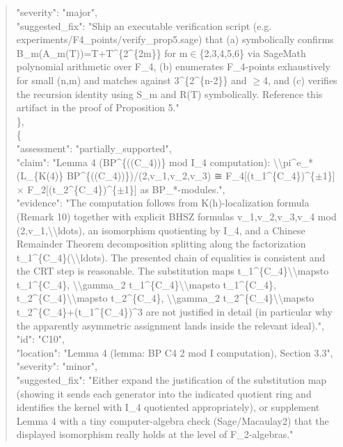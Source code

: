 \documentclass[11pt]{article}
\begin{document}
\begin{quote}
      "severity": "major",\\
      "suggested\_fix": "Ship an executable verification script (e.g. experiments/F4\_points/verify\_prop5.sage) that (a) symbolically confirms B\_m(A\_m(T))=T+T\^{}\{2\^{}\{2m\}\} for m\ensuremath{\in}\{2,3,4,5,6\} via SageMath polynomial arithmetic over F\_4, (b) enumerates F\_4-points exhaustively for small (n,m) and matches against 3\^{}\{2\^{}\{n-2\}\} and \ensuremath{\ge}4, and (c) verifies the recursion identity using S\_m and R(T) symbolically. Reference this artifact in the proof of Proposition 5."\\
    \},\\
    \{\\
      "assessment": "partially\_supported",\\
      "claim": "Lemma 4 (BP\^{}\{((C\_4))\}<2> mod I\_4 computation): \textbackslash{}\textbackslash{}pi\^{}e\_*(L\_\{K(4)\} BP\^{}\{((C\_4))\}<2>)/(2,v\_1,v\_2,v\_3) ≅ F\_4[(t\_1\^{}\{C\_4\})\^{}\{\ensuremath{\pm}1\}] \ensuremath{\times} F\_2[(t\_2\^{}\{C\_4\})\^{}\{\ensuremath{\pm}1\}] as BP\_*-modules.",\\
      "evidence": "The computation follows from K(h)-localization formula (Remark 10) together with explicit BHSZ formulas v\_1,v\_2,v\_3,v\_4 mod (2,v\_1,\textbackslash{}\textbackslash{}ldots), an isomorphism quotienting by I\_4, and a Chinese Remainder Theorem decomposition splitting along the factorization t\_1\^{}\{C\_4\}(\textbackslash{}\textbackslash{}ldots). The presented chain of equalities is consistent and the CRT step is reasonable. The substitution maps t\_1\^{}\{C\_4\}\textbackslash{}\textbackslash{}mapsto t\_1\^{}\{C\_4\}, \textbackslash{}\textbackslash{}gamma\_2 t\_1\^{}\{C\_4\}\textbackslash{}\textbackslash{}mapsto t\_1\^{}\{C\_4\}, t\_2\^{}\{C\_4\}\textbackslash{}\textbackslash{}mapsto t\_2\^{}\{C\_4\}, \textbackslash{}\textbackslash{}gamma\_2 t\_2\^{}\{C\_4\}\textbackslash{}\textbackslash{}mapsto t\_2\^{}\{C\_4\}+(t\_1\^{}\{C\_4\})\^{}3 are not justified in detail (in particular why the apparently asymmetric assignment lands inside the relevant ideal).",\\
      "id": "C10",\\
      "location": "Lemma 4 (lemma: BP C4 2 mod I computation), Section 3.3",\\
      "severity": "minor",\\
      "suggested\_fix": "Either expand the justification of the substitution map (showing it sends each generator into the indicated quotient ring and identifies the kernel with I\_4 quotiented appropriately), or supplement Lemma 4 with a tiny computer-algebra check (Sage/Macaulay2) that the displayed isomorphism really holds at the level of F\_2-algebras."\\

\end{quote}
\end{document}

